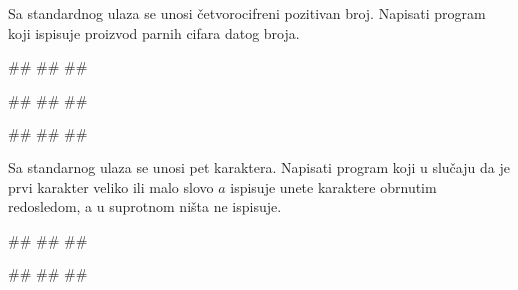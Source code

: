 \begin{Exercise}[label=p1.2_04] 
 Sa standardnog ulaza se unosi četvorocifreni pozitivan broj. Napisati program koji ispisuje proizvod parnih cifara datog broja. 

\begin{miditest}
\begin{upotreba}{1}
#\naslovInt#
##
##
\end{upotreba}
\end{miditest}
\begin{miditest}
\begin{upotreba}{2}
#\naslovInt#
##
##
\end{upotreba}
\end{miditest}

\begin{miditest}
\begin{upotreba}{3}
#\naslovInt#
##
##
\end{upotreba}
\end{miditest}


\end{Exercise}
\begin{Answer}[ref=p1.2_04]
\end{Answer}

\begin{Exercise}[label=p1.2_05] 
 Sa standarnog ulaza se unosi pet karaktera. Napisati program koji u slučaju da je prvi karakter veliko ili malo slovo $a$  ispisuje unete karaktere obrnutim redosledom, a u suprotnom ništa ne ispisuje. 
 
\begin{miditest}
\begin{upotreba}{1}
#\naslovInt#
##
##
\end{upotreba}
\end{miditest}
\begin{miditest}
\begin{upotreba}{2}
#\naslovInt#
##
#\izlaz{}#
\end{upotreba}
\end{miditest}

\end{Exercise}
\begin{Answer}[ref=p1.2_05]
\end{Answer}

